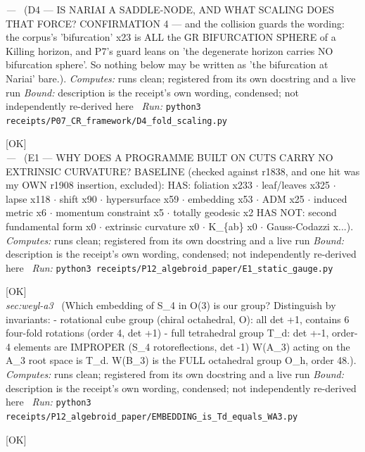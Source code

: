 \begin{description}
\textit{---} \ (D4 --- IS NARIAI A SADDLE-NODE, AND WHAT SCALING DOES THAT FORCE? CONFIRMATION 4 --- and the collision guards the wording: the corpus's 'bifurcation' x23 is ALL the GR BIFURCATION SPHERE of a Killing horizon, and P7's guard leans on 'the degenerate horizon carries NO bifurcation sphere'. So nothing below may be written as 'the bifurcation at Nariai' bare.). 
\emph{Computes:} runs clean; registered from its own docstring and a live run
 \emph{Bound:} description is the receipt's own wording, condensed; not independently re-derived here
\ \emph{Run:} \texttt{python3 receipts/P07\_CR\_framework/D4\_fold\_scaling.py}
\item[\label{rcpt:E1_static_gauge}\texttt{E1\_static\_gauge}]\hfill\textsf{[OK]}\\
\textit{---} \ (E1 --- WHY DOES A PROGRAMME BUILT ON CUTS CARRY NO EXTRINSIC CURVATURE? BASELINE (checked against r1838, and one hit was my OWN r1908 insertion, excluded): HAS: foliation x233 \ensuremath{\cdot} leaf/leaves x325 \ensuremath{\cdot} lapse x118 \ensuremath{\cdot} shift x90 \ensuremath{\cdot} hypersurface x59 \ensuremath{\cdot} embedding x53 \ensuremath{\cdot} ADM x25 \ensuremath{\cdot} induced metric x6 \ensuremath{\cdot} momentum constraint x5 \ensuremath{\cdot} totally geodesic x2 HAS NOT: second fundamental form x0 \ensuremath{\cdot} extrinsic curvature x0 \ensuremath{\cdot} K\_\{ab\} x0 \ensuremath{\cdot} Gauss-Codazzi x...). 
\emph{Computes:} runs clean; registered from its own docstring and a live run
 \emph{Bound:} description is the receipt's own wording, condensed; not independently re-derived here
\ \emph{Run:} \texttt{python3 receipts/P12\_algebroid\_paper/E1\_static\_gauge.py}
\item[\label{rcpt:EMBEDDING_is_Td_equals_WA3}\texttt{EMBEDDING\_is\_Td\_equals\_WA3}]\hfill\textsf{[OK]}\\
\textit{sec:weyl-a3} \ (Which embedding of S\_4 in O(3) is our group? Distinguish by invariants: - rotational cube group (chiral octahedral, O): all det +1, contains 6 four-fold rotations (order 4, det +1) - full tetrahedral group T\_d: det +-1, order-4 elements are IMPROPER (S\_4 rotoreflections, det -1) W(A\_3) acting on the A\_3 root space is T\_d. W(B\_3) is the FULL octahedral group O\_h, order 48.). 
\emph{Computes:} runs clean; registered from its own docstring and a live run
 \emph{Bound:} description is the receipt's own wording, condensed; not independently re-derived here
\ \emph{Run:} \texttt{python3 receipts/P12\_algebroid\_paper/EMBEDDING\_is\_Td\_equals\_WA3.py}
\item[\label{rcpt:EUCNULL_continuous_null_definition}\texttt{EUCNULL\_continuous\_null\_definition}]\hfill\textsf{[OK]}\\

\end{description}
